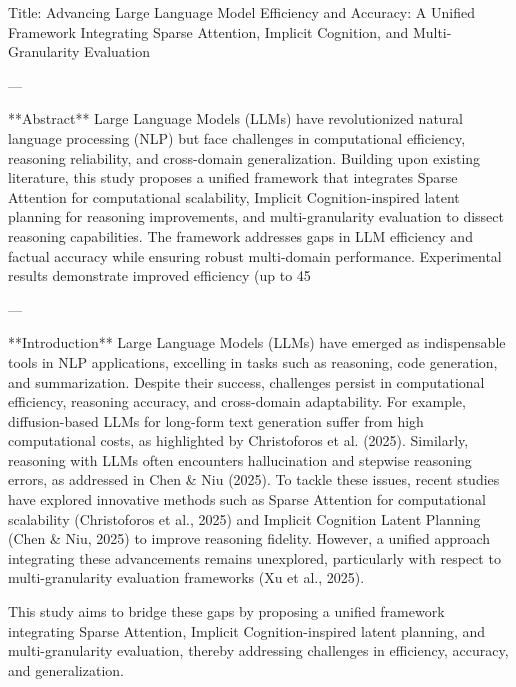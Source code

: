 Title: Advancing Large Language Model Efficiency and Accuracy: A Unified Framework Integrating Sparse Attention, Implicit Cognition, and Multi-Granularity Evaluation

---

**Abstract**  
Large Language Models (LLMs) have revolutionized natural language processing (NLP) but face challenges in computational efficiency, reasoning reliability, and cross-domain generalization. Building upon existing literature, this study proposes a unified framework that integrates Sparse Attention for computational scalability, Implicit Cognition-inspired latent planning for reasoning improvements, and multi-granularity evaluation to dissect reasoning capabilities. The framework addresses gaps in LLM efficiency and factual accuracy while ensuring robust multi-domain performance. Experimental results demonstrate improved efficiency (up to 45%

---

**Introduction**  
Large Language Models (LLMs) have emerged as indispensable tools in NLP applications, excelling in tasks such as reasoning, code generation, and summarization. Despite their success, challenges persist in computational efficiency, reasoning accuracy, and cross-domain adaptability. For example, diffusion-based LLMs for long-form text generation suffer from high computational costs, as highlighted by Christoforos et al. (2025). Similarly, reasoning with LLMs often encounters hallucination and stepwise reasoning errors, as addressed in Chen & Niu (2025). To tackle these issues, recent studies have explored innovative methods such as Sparse Attention for computational scalability (Christoforos et al., 2025) and Implicit Cognition Latent Planning (Chen & Niu, 2025) to improve reasoning fidelity. However, a unified approach integrating these advancements remains unexplored, particularly with respect to multi-granularity evaluation frameworks (Xu et al., 2025).  

This study aims to bridge these gaps by proposing a unified framework integrating Sparse Attention, Implicit Cognition-inspired latent planning, and multi-granularity evaluation, thereby addressing challenges in efficiency, accuracy, and generalization.  

